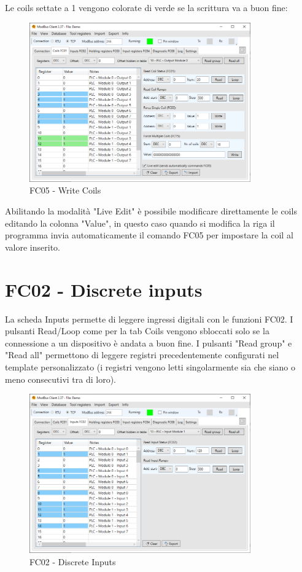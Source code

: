 Le coils settate a 1 vengono colorate di verde se la scrittura va a
buon fine:

\begin{figure}[H]
\centering
\includegraphics[width=0.85\textwidth]{../Img/Modbus_Client_Coils_Write_00.PNG}
\caption{FC05 - Write Coils}
\end{figure}

Abilitando la modalità "Live Edit" è possibile modificare direttamente 
le coils editando la colonna "Value", in questo caso quando si modifica la riga il 
programma invia automaticamente il comando FC05 per impostare la coil al valore inserito.

\newpage
\section{FC02 - Discrete inputs}

La scheda Inputs permette di leggere ingressi digitali con le funzioni FC02. I pulsanti Read/Loop
come per la tab Coils vengono sbloccati solo se la connessione a un dispositivo è andata a buon
fine. I pulsanti "Read group" e "Read all" permettono di leggere registri precedentemente configurati 
nel template personalizzato (i registri vengono letti singolarmente sia che siano o meno consecutivi
tra di loro).

\begin{figure}[H]
\centering
\includegraphics[width=0.85\textwidth]{../Img/Modbus_Client_Inputs_00.PNG}
\caption{FC02 - Discrete Inputs}
\end{figure}

